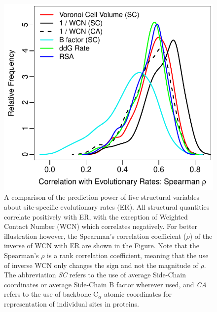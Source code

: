 \documentclass[11pt]{article}
\begin{document}
    \begin{figure}
        \begin{center}
        \includegraphics[width=5.5in]{best_structural_predictors_of_ER.pdf}
        \end{center}
        \caption{A comparison of the prediction power of five structural variables about site-specific evolutionary rates (ER). All structural quantities correlate positively with ER, with the exception of Weighted Contact Number (WCN) which correlates negatively. For better illustration however, the Spearman's correlation coefficient ($\rho$) of the inverse of WCN with ER are shown in the Figure. Note that the Spearman's $\rho$ is a rank correlation coefficient, meaning that the use of inverse WCN only changes the sign and not the magnitude of $\rho$. The abbreviation {\it SC} refers to the use of average Side-Chain coordinates or average Side-Chain B factor wherever used, and {\it CA} refers to the use of backbone C$_\alpha$ atomic coordinates for representation of individual sites in proteins.}
        \label{fig:best_predictorER}
    \end{figure}
\end{document}
